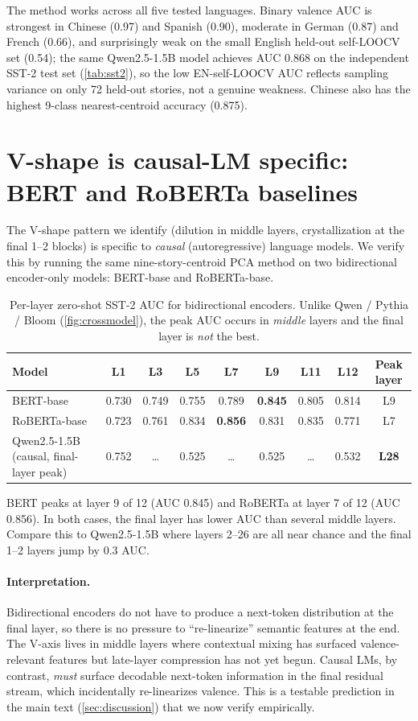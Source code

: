 The method works across all five tested languages. Binary valence AUC
is strongest in Chinese (0.97) and Spanish (0.90), moderate in German
(0.87) and French (0.66), and surprisingly weak on the small
English held-out self-LOOCV set (0.54); the same Qwen2.5-1.5B model
achieves AUC 0.868 on the independent SST-2 test set (\cref{tab:sst2}),
so the low EN-self-LOOCV AUC reflects sampling variance on only 72 held-out
stories, not a genuine weakness. Chinese also has the highest 9-class
nearest-centroid accuracy (0.875).

\section{V-shape is causal-LM specific: BERT and RoBERTa baselines}
\label{sup:bidirectional}

The V-shape pattern we identify (dilution in middle layers, crystallization at
the final 1--2 blocks) is specific to \emph{causal} (autoregressive) language
models. We verify this by running the same nine-story-centroid PCA method on
two bidirectional encoder-only models: BERT-base and RoBERTa-base.

\begin{table}[h]
\centering
\caption{Per-layer zero-shot SST-2 AUC for bidirectional encoders. Unlike
Qwen / Pythia / Bloom (\cref{fig:crossmodel}), the peak AUC occurs in
\emph{middle} layers and the final layer is \emph{not} the best.}
\label{tab:sup_bidirectional}
\begin{tabular}{lcccccccc}
\toprule
Model & L1 & L3 & L5 & L7 & L9 & L11 & L12 & Peak layer \\
\midrule
BERT-base      & 0.730 & 0.749 & 0.755 & 0.789 & \textbf{0.845} & 0.805 & 0.814 & L9  \\
RoBERTa-base   & 0.723 & 0.761 & 0.834 & \textbf{0.856} & 0.831 & 0.835 & 0.771 & L7  \\
\midrule
Qwen2.5-1.5B (causal, final-layer peak) & 0.752 & \ldots & 0.525 & \ldots & 0.525 & \ldots & 0.532 & \textbf{L28} \\
\bottomrule
\end{tabular}
\end{table}

BERT peaks at layer 9 of 12 (AUC 0.845) and RoBERTa at layer 7 of 12 (AUC
0.856). In both cases, the final layer has lower AUC than several middle
layers. Compare this to Qwen2.5-1.5B where layers 2--26 are all near chance
and the final 1--2 layers jump by 0.3 AUC.

\paragraph{Interpretation.}
Bidirectional encoders do not have to produce a next-token distribution at
the final layer, so there is no pressure to ``re-linearize'' semantic
features at the end. The V-axis lives in middle layers where contextual
mixing has surfaced valence-relevant features but late-layer compression
has not yet begun. Causal LMs, by contrast, \emph{must} surface decodable
next-token information in the final residual stream, which incidentally
re-linearizes valence. This is a testable prediction in the main text
(\cref{sec:discussion}) that we now verify empirically.

